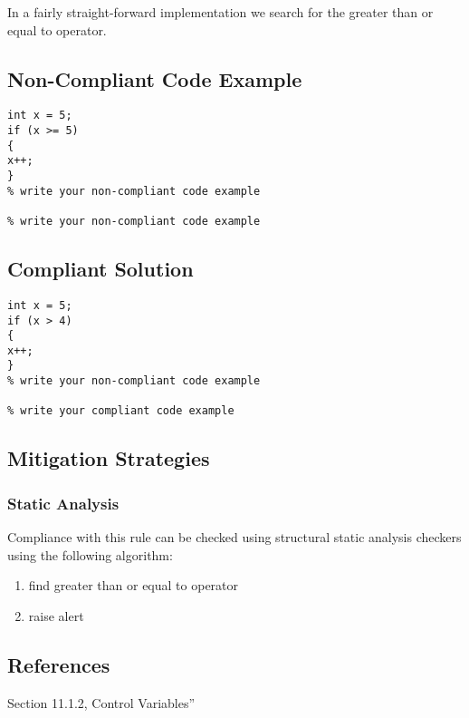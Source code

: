       In a fairly straight-forward implementation we search for the
      greater than or equal to operator.



\subsection{Non-Compliant Code Example}


\begin{verbatim}
int x = 5;
if (x >= 5)
{
x++;
}
% write your non-compliant code example

% write your non-compliant code example

\end{verbatim}

\subsection{Compliant Solution}


\begin{verbatim}
int x = 5;
if (x > 4)
{
x++;
}
% write your non-compliant code example

% write your compliant code example

\end{verbatim}

\subsection{Mitigation Strategies}
\subsubsection{Static Analysis} 

Compliance with this rule can be checked using structural static analysis checkers using the following algorithm:

\begin{enumerate}
\item find greater than or equal to operator
\item raise alert
\end{enumerate}

\subsection{References}

 Section 11.1.2,
Control Variables''
